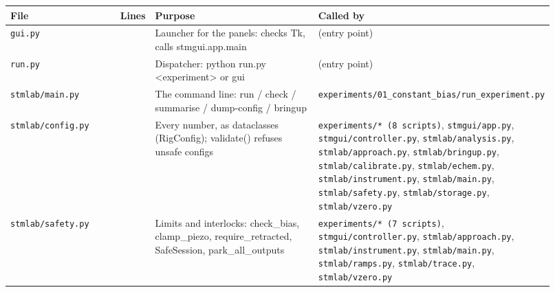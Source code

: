 \small\setlength{\LTleft}{0pt}\setlength{\LTright}{\fill}
\begin{longtable}{@{}>{\raggedright\arraybackslash}p{0.230\linewidth}>{\raggedright\arraybackslash}p{0.058\linewidth}>{\raggedright\arraybackslash}p{0.403\linewidth}>{\raggedright\arraybackslash}p{0.230\linewidth}@{}}
\toprule
\textbf{File} & \textbf{Lines} & \textbf{Purpose} & \textbf{Called by} \\
\midrule\endhead
\texttt{gui.\discretionary{}{}{}py} & 37 & Launcher for the panels: checks Tk, calls stmgui.app.main & (entry point) \\
\texttt{run.\discretionary{}{}{}py} & 65 & Dispatcher: python run.py <experiment> or gui & (entry point) \\
\texttt{stmlab/\discretionary{}{}{}main.\discretionary{}{}{}py} & 213 & The command line: run / check / summarise / dump-config / bringup & \texttt{experiments/\discretionary{}{}{}01\_\discretionary{}{}{}constant\_\discretionary{}{}{}bias/\discretionary{}{}{}run\_\discretionary{}{}{}experiment.\discretionary{}{}{}py} \\
\texttt{stmlab/\discretionary{}{}{}config.\discretionary{}{}{}py} & 677 & Every number, as dataclasses (RigConfig); validate() refuses unsafe configs & \texttt{experiments/\discretionary{}{}{}* (8 scripts)}, \texttt{stmgui/\discretionary{}{}{}app.\discretionary{}{}{}py}, \texttt{stmgui/\discretionary{}{}{}controller.\discretionary{}{}{}py}, \texttt{stmlab/\discretionary{}{}{}analysis.\discretionary{}{}{}py}, \texttt{stmlab/\discretionary{}{}{}approach.\discretionary{}{}{}py}, \texttt{stmlab/\discretionary{}{}{}bringup.\discretionary{}{}{}py}, \texttt{stmlab/\discretionary{}{}{}calibrate.\discretionary{}{}{}py}, \texttt{stmlab/\discretionary{}{}{}echem.\discretionary{}{}{}py}, \texttt{stmlab/\discretionary{}{}{}instrument.\discretionary{}{}{}py}, \texttt{stmlab/\discretionary{}{}{}main.\discretionary{}{}{}py}, \texttt{stmlab/\discretionary{}{}{}safety.\discretionary{}{}{}py}, \texttt{stmlab/\discretionary{}{}{}storage.\discretionary{}{}{}py}, \texttt{stmlab/\discretionary{}{}{}vzero.\discretionary{}{}{}py} \\
\texttt{stmlab/\discretionary{}{}{}safety.\discretionary{}{}{}py} & 219 & Limits and interlocks: check\_bias, clamp\_piezo, require\_retracted, SafeSession, park\_all\_outputs & \texttt{experiments/\discretionary{}{}{}* (7 scripts)}, \texttt{stmgui/\discretionary{}{}{}controller.\discretionary{}{}{}py}, \texttt{stmlab/\discretionary{}{}{}approach.\discretionary{}{}{}py}, \texttt{stmlab/\discretionary{}{}{}instrument.\discretionary{}{}{}py}, \texttt{stmlab/\discretionary{}{}{}main.\discretionary{}{}{}py}, \texttt{stmlab/\discretionary{}{}{}ramps.\discretionary{}{}{}py}, \texttt{stmlab/\discretionary{}{}{}trace.\discretionary{}{}{}py}, \texttt{stmlab/\discretionary{}{}{}vzero.\discretionary{}{}{}py} \\

\end{longtable}
